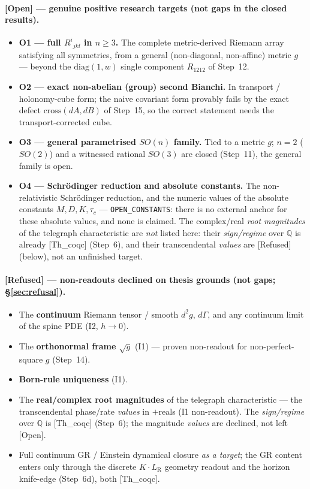 \documentclass[10pt,twocolumn]{article}
\theoremstyle{definition}
\newcommand{\Thq}{\textsf{[Th\_coqc]}}   %
\newcommand{\Open}{\textsf{[Open]}}      %
\newcommand{\Refu}{\textsf{[Refused]}}    %
\newcommand{\code}[1]{\texttt{#1}}
\newcommand{\LR}{L_{\mathrm R}}
\begin{document}
\paragraph{[Open] --- genuine positive research targets (not gaps in the closed
results).}
\begin{itemize}\setlength\itemsep{2pt}
\item[\Open] \textbf{O1 --- full $R^i{}_{jkl}$ in $n\ge3$.} The complete
metric-derived Riemann array satisfying all symmetries, from a general
(non-diagonal, non-affine) metric $g$ --- beyond the $\mathrm{diag}(1,w)$ single
component $R_{1212}$ of Step~12.
\item[\Open] \textbf{O2 --- exact non-abelian (group) second Bianchi.} In
transport / holonomy-cube form; the naive covariant form provably fails by the
exact defect $\mathrm{cross}(dA,dB)$ of Step~15, so the correct statement needs
the transport-corrected cube.
\item[\Open] \textbf{O3 --- general parametrised $SO(n)$ family.} Tied to a
metric $g$; $n=2$ ($SO(2)$) and a witnessed rational $SO(3)$ are closed
(Step~11), the general family is open.
\item[\Open] \textbf{O4 --- Schr\"odinger reduction and absolute constants.} The
non-relativistic Schr\"odinger reduction, and the numeric values of the absolute
constants $M,D,K,\tau_c$ --- \code{OPEN\_CONSTANTS}: there is no external anchor
for these absolute values, and none is claimed. The complex/real \emph{root
magnitudes} of the telegraph characteristic are \emph{not} listed here: their
\emph{sign/regime} over $\mathbb{Q}$ is already \Thq{} (Step~6), and their
transcendental \emph{values} are \Refu{} (below), not an unfinished target.
\end{itemize}

\paragraph{[Refused] --- non-readouts declined on thesis grounds (not gaps;
\S\ref{sec:refusal}).}
\begin{itemize}\setlength\itemsep{2pt}
\item[\Refu] The \textbf{continuum} Riemann tensor / smooth $d^2g$, $d\Gamma$, and
any continuum limit of the spine PDE (I2, $h\to0$).
\item[\Refu] The \textbf{orthonormal frame $\sqrt{g}$} (I1) --- proven
non-readout for non-perfect-square $g$ (Step~14).
\item[\Refu] \textbf{Born-rule uniqueness} (I1).
\item[\Refu] The \textbf{real/complex root magnitudes} of the telegraph
characteristic --- the transcendental phase/rate \emph{values} in $+$reals (I1
non-readout). The \emph{sign/regime} over $\mathbb{Q}$ is \Thq{} (Step~6); the
magnitude \emph{values} are declined, not left \Open{}.
\item[\Refu] Full continuum GR / Einstein dynamical closure \emph{as a target};
the GR content enters only through the discrete $K\!\cdot\!\LR$ geometry readout
and the horizon knife-edge (Step~6d), both \Thq{}.
\end{itemize}
\end{document}
